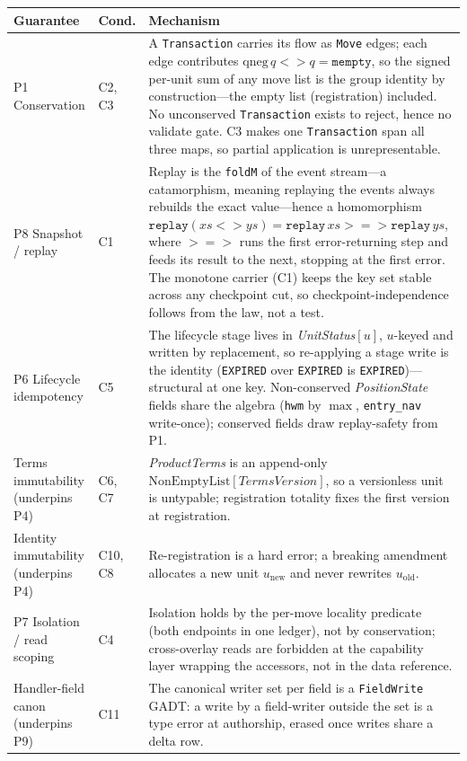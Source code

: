 \begin{center}
\small
\begin{longtable}{@{}p{3.5cm}p{1.6cm}p{6.4cm}@{}}
\toprule
\textbf{Guarantee} & \textbf{Cond.} & \textbf{Mechanism} \\
\midrule
\endhead
P1 Conservation & C2, C3 & A \texttt{Transaction} carries its flow as \texttt{Move} edges; each edge contributes $\mathrm{qneg}\,q\mathbin{<\!\!>}q=\texttt{mempty}$, so the signed per-unit sum of any move list is the group identity by construction---the empty list (registration) included. No unconserved \texttt{Transaction} exists to reject, hence no validate gate. C3 makes one \texttt{Transaction} span all three maps, so partial application is unrepresentable. \\
P8 Snapshot / replay & C1 & Replay is the \texttt{foldM} of the event stream---a catamorphism, meaning replaying the events always rebuilds the exact value---hence a homomorphism $\texttt{replay}(xs\mathbin{<\!\!>}ys)=\texttt{replay}\,xs \mathrel{>\!\!=\!\!>} \texttt{replay}\,ys$, where $\mathbin{>\!\!=\!\!>}$ runs the first error-returning step and feeds its result to the next, stopping at the first error. The monotone carrier (C1) keeps the key set stable across any checkpoint cut, so checkpoint-independence follows from the law, not a test. \\
P6 Lifecycle idempotency & C5 & The lifecycle stage lives in \emph{UnitStatus}$[u]$, $u$-keyed and written by replacement, so re-applying a stage write is the identity (\texttt{EXPIRED} over \texttt{EXPIRED} is \texttt{EXPIRED})---structural at one key. Non-conserved \emph{PositionState} fields share the algebra (\texttt{hwm} by $\max$, \texttt{entry\_nav} write-once); conserved fields draw replay-safety from P1. \\
Terms immutability (underpins P4) & C6, C7 & \emph{ProductTerms} is an append-only $\mathrm{NonEmptyList}[\mathit{TermsVersion}]$, so a versionless unit is untypable; registration totality fixes the first version at registration. \\
Identity immutability (underpins P4) & C10, C8 & Re-registration is a hard error; a breaking amendment allocates a new unit $u_{\mathrm{new}}$ and never rewrites $u_{\mathrm{old}}$. \\
P7 Isolation / read scoping & C4 & Isolation holds by the per-move locality predicate (both endpoints in one ledger), not by conservation; cross-overlay reads are forbidden at the capability layer wrapping the accessors, not in the data reference. \\
Handler-field canon (underpins P9) & C11 & The canonical writer set per field is a \texttt{FieldWrite} GADT: a write by a field-writer outside the set is a type error at authorship, erased once writes share a delta row. \\
\bottomrule
\end{longtable}
\end{center}

